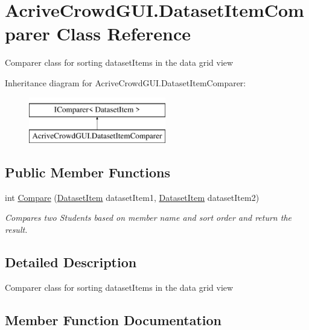 \hypertarget{class_acrive_crowd_g_u_i_1_1_dataset_item_comparer}{}\section{Acrive\+Crowd\+G\+U\+I.\+Dataset\+Item\+Comparer Class Reference}
\label{class_acrive_crowd_g_u_i_1_1_dataset_item_comparer}


Comparer class for sorting dataset\+Items in the data grid view  


Inheritance diagram for Acrive\+Crowd\+G\+U\+I.\+Dataset\+Item\+Comparer\+:\begin{figure}[H]
\begin{center}
\leavevmode
\includegraphics[height=2.000000cm]{class_acrive_crowd_g_u_i_1_1_dataset_item_comparer}
\end{center}
\end{figure}
\subsection*{Public Member Functions}
\begin{DoxyCompactItemize}
\item 
int \hyperlink{class_acrive_crowd_g_u_i_1_1_dataset_item_comparer_aa550f9ad40ceed144f969fc203a5211c}{Compare} (\hyperlink{class_acrive_crowd_g_u_i_1_1_dataset_item}{Dataset\+Item} dataset\+Item1, \hyperlink{class_acrive_crowd_g_u_i_1_1_dataset_item}{Dataset\+Item} dataset\+Item2)
\begin{DoxyCompactList}\small\item\em Compares two Students based on member name and sort order and return the result. \end{DoxyCompactList}\end{DoxyCompactItemize}


\subsection{Detailed Description}
Comparer class for sorting dataset\+Items in the data grid view 



\subsection{Member Function Documentation}
\hypertarget{class_acrive_crowd_g_u_i_1_1_dataset_item_comparer_aa550f9ad40ceed144f969fc203a5211c}{}
